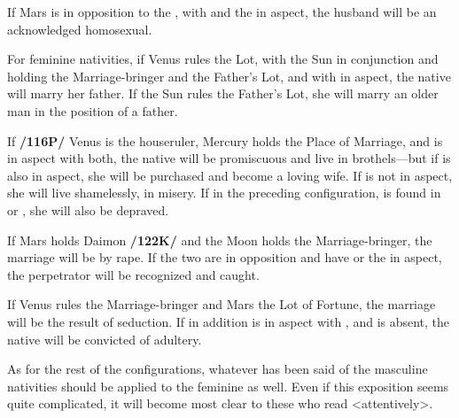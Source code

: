 If Mars is in opposition to the \Moon, with \Saturn\xspace and the \Sun\xspace in aspect, the husband will be an acknowledged homosexual. 

For feminine nativities, if Venus rules the Lot, with the Sun in conjunction and holding the Marriage-bringer and the Father’s Lot, and with \Saturn\xspace in aspect, the native will marry her father. If the Sun rules the Father’s Lot, she will marry an older man in the position of a father. 

If \textbf{/116P/} Venus is the houseruler, Mercury holds the Place of Marriage, and \Saturn\xspace is in aspect with both, the native will be
promiscuous and live in brothels—but if \Jupiter\xspace is also in aspect, she will be purchased and become a loving wife. If \Jupiter\xspace is not in aspect, she will live shamelessly, in misery.  If in the preceding configuration, \Venus\xspace is found in \Pisces\xspace or \Capricorn, she will also be depraved. 

If Mars holds Daimon \textbf{/122K/} and the Moon holds the Marriage-bringer, the marriage will be by rape. If the two are in opposition and have \Saturn\xspace or the \Sun\xspace in aspect, the perpetrator will be recognized and caught. 

If Venus rules the Marriage-bringer and Mars the Lot of Fortune, the marriage will be the result of seduction. If in addition \Saturn\xspace is in aspect with \Mercury, and \Jupiter\xspace is absent, the native will be convicted of adultery.

As for the rest of the configurations, whatever has been said of the masculine nativities should be applied to the feminine as well. Even if this exposition seems quite complicated, it will become most clear to these who read <attentively>.

\newpage